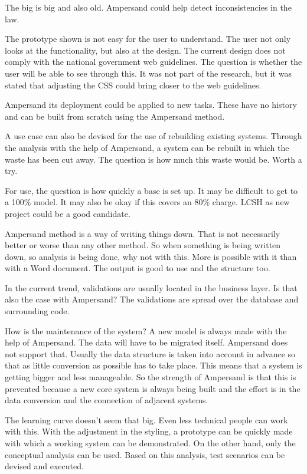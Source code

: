 
{The \acrshort{big} is big and also old. 
Ampersand could help detect inconsistencies in the law.}

{The prototype shown is not easy for the user to understand. 
The user not only looks at the functionality, but also at the design.
The current design does not comply with the national government web guidelines.
The question is whether the user will be able to see through this. 
It was not part of the research, but it was stated that adjusting the CSS could bring closer to the web guidelines.}

{Ampersand its deployment could be applied to new tasks. 
These have no history and can be built from scratch using the Ampersand method.}

{A use case can also be devised for the use of rebuilding existing systems. 
Through the analysis with the help of Ampersand, a system can be rebuilt in which the waste has been cut away. 
The question is how much this waste would be. Worth a try.}

{For use, the question is how quickly a base is set up. 
It may be difficult to get to a 100\% model. 
It may also be okay if this covers an 80\% charge.
LCSH as new project could be a good candidate.}

{Ampersand method is a way of writing things down. 
That is not necessarily better or worse than any other method. 
So when something is being written down, so analysis is being done, why not with this. 
More is possible with it than with a Word document. 
The output is good to use and the structure too.}

{In the current trend, validations are usually located in the business layer.
Is that also the case with Ampersand? 
The validations are spread over the database and surrounding code.}

{How is the maintenance of the system? 
A new model is always made with the help of Ampersand. 
The data will have to be migrated itself. 
Ampersand does not support that. 
Usually the data structure is taken into account in advance so that as little conversion as possible has to take place. 
This means that a system is getting bigger and less manageable. 
So the strength of Ampersand is that this is prevented because a new core system is always being built and the effort is in the data conversion and the connection of adjacent systems.}

{The learning curve doesn't seem that big. 
Even less technical people can work with this. 
With the adjustment in the styling, a prototype can be quickly made with which a working system can be demonstrated. 
On the other hand, only the conceptual analysis can be used. 
Based on this analysis, test scenarios can be devised and executed.}

